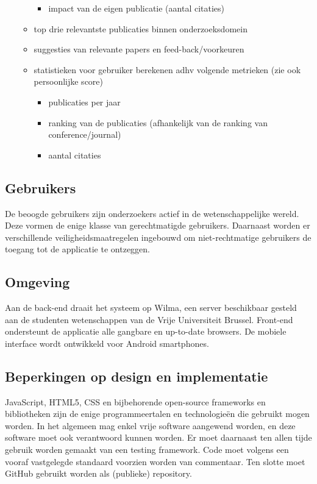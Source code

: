 \documentclass{article}
\begin{document}
\begin{itemize}
\begin{itemize}
\begin{itemize}
    		\item impact van de eigen publicatie (aantal citaties)
    	\end{itemize}
	\item top drie relevantste publicaties binnen onderzoeksdomein 
	\item suggesties van relevante papers en feed-back/voorkeuren 
    \item statistieken voor gebruiker berekenen adhv volgende metrieken (zie ook persoonlijke score)
      	\begin{itemize}
    		\item publicaties per jaar
   		 \item ranking van de publicaties (afhankelijk van de ranking van conference/journal)
    		\item aantal citaties
    	\end{itemize}
    \end{itemize}
\end{itemize}




\subsection{Gebruikers}
De beoogde gebruikers zijn onderzoekers actief in de wetenschappelijke wereld. Deze vormen de enige klasse van gerechtmatigde gebruikers. Daarnaast worden er verschillende veiligheidsmaatregelen ingebouwd om niet-rechtmatige gebruikers de toegang tot de applicatie te ontzeggen. 

\subsection{Omgeving}
Aan de back-end draait het systeem op Wilma, een server beschikbaar gesteld aan de studenten wetenschappen van de Vrije Universiteit Brussel.  Front-end ondersteunt de applicatie alle gangbare en up-to-date browsers. De mobiele interface wordt ontwikkeld voor Android smartphones.

\subsection{Beperkingen op design en implementatie}
JavaScript, HTML5, CSS en bijbehorende open-source frameworks en bibliotheken zijn de enige programmeertalen en technologie\"{e}n die gebruikt mogen worden. In het algemeen mag enkel vrije software aangewend worden, en deze software moet ook verantwoord kunnen worden. Er moet daarnaast ten allen tijde gebruik worden gemaakt van een testing framework. Code moet volgens een vooraf vastgelegde standaard voorzien worden van commentaar. Ten slotte moet GitHub gebruikt worden als (publieke) repository. 
\end{document}
